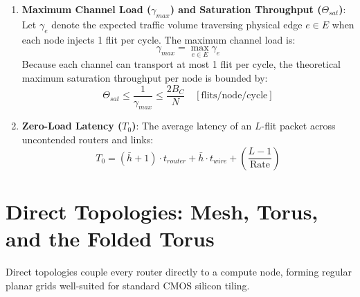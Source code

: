 \begin{enumerate}
\begin{equation}
    B_C = \min_{V_1, V_2} \sum_{u \in V_1, v \in V_2, (u, v) \in E} C(u, v)
    \label{eq:ch4_bisection}
    \end{equation}
    where $C(u, v)$ denotes link bandwidth. In networks with uniform channel width $W$ bits and clock frequency $f_{clk}$, bisection bandwidth is expressed as channel count $N_C$: $B_C = N_C \cdot W \cdot f_{clk}$.
    \item \textbf{Maximum Channel Load ($\gamma_{max}$) and Saturation Throughput ($\Theta_{sat}$)}:
    Let $\gamma_e$ denote the expected traffic volume traversing physical edge $e \in E$ when each node injects 1 flit per cycle. The maximum channel load is:
    \begin{equation}
    \gamma_{max} = \max_{e \in E} \gamma_e
    \label{eq:ch4_gamma}
    \end{equation}
    Because each channel can transport at most 1 flit per cycle, the theoretical maximum saturation throughput per node is bounded by:
    \begin{equation}
    \Theta_{sat} \le \frac{1}{\gamma_{max}} \le \frac{2 B_C}{N} \quad [\text{flits/node/cycle}]
    \label{eq:ch4_throughput_bound}
    \end{equation}
    \item \textbf{Zero-Load Latency ($T_0$)}: The average latency of an $L$-flit packet across uncontended routers and links:
    \begin{equation}
    T_0 = (\bar{h} + 1) \cdot t_{router} + \bar{h} \cdot t_{wire} + \left( \frac{L - 1}{\text{Rate}} \right)
    \label{eq:ch4_zero_load_lat}
    \end{equation}
\end{enumerate}

\section{Direct Topologies: Mesh, Torus, and the Folded Torus}
\label{sec:ch4_direct}

Direct topologies couple every router directly to a compute node, forming regular planar grids well-suited for standard CMOS silicon tiling.

